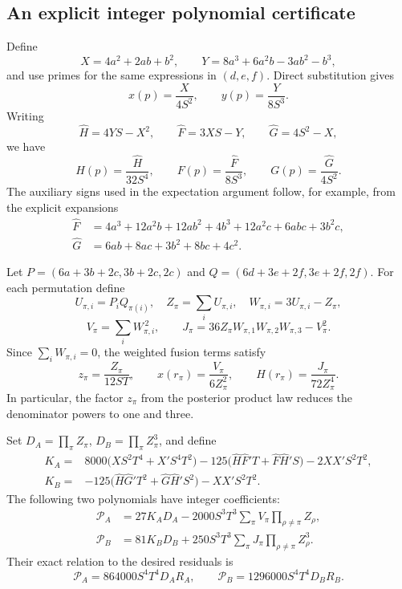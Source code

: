 \subsection{An explicit integer polynomial certificate}

Define
\[
 X=4a^2+2ab+b^2,\qquad
 Y=8a^3+6a^2b-3ab^2-b^3,
\]
and use primes for the same expressions in \((d,e,f)\).  Direct
substitution gives
\[
 x(p)=\frac{X}{4S^2},\qquad y(p)=\frac{Y}{8S^3}.
\]
Writing
\[
 \widehat H=4YS-X^2,\qquad
 \widehat F=3XS-Y,\qquad
 \widehat G=4S^2-X,
\]
we have
\[
 H(p)=\frac{\widehat H}{32S^4},\qquad
 F(p)=\frac{\widehat F}{8S^3},\qquad
 G(p)=\frac{\widehat G}{4S^2}.
\]
The auxiliary signs used in the expectation argument follow, for example,
from the explicit expansions
\begin{align*}
 \widehat F
 &=4a^3+12a^2b+12ab^2+4b^3+12a^2c+6abc+3b^2c,\\
 \widehat G
 &=6ab+8ac+3b^2+8bc+4c^2.
\end{align*}

Let \(P=(6a+3b+2c,3b+2c,2c)\) and
\(Q=(6d+3e+2f,3e+2f,2f)\).  For each permutation define
\[
 U_{\pi,i}=P_iQ_{\pi(i)},\quad
 Z_\pi=\sum_iU_{\pi,i},\quad
 W_{\pi,i}=3U_{\pi,i}-Z_\pi,
\]
\[
 V_\pi=\sum_iW_{\pi,i}^{\,2},\qquad
 J_\pi=36Z_\pi W_{\pi,1}W_{\pi,2}W_{\pi,3}-V_\pi^2.
\]
Since \(\sum_iW_{\pi,i}=0\), the weighted fusion terms satisfy
\[
 z_\pi=\frac{Z_\pi}{12ST},\qquad
 x(r_\pi)=\frac{V_\pi}{6Z_\pi^2},\qquad
 H(r_\pi)=\frac{J_\pi}{72Z_\pi^4}.
\]
In particular, the factor \(z_\pi\) from the posterior product law reduces
the denominator powers to one and three.

Set \(D_A=\prod_\pi Z_\pi\), \(D_B=\prod_\pi Z_\pi^3\), and define
\begin{align*}
 K_A={}&8000\bigl(XS^2T^4+X'S^4T^2\bigr)
       -125\bigl(\widehat H\widehat F'T+\widehat F\widehat H'S\bigr)
       -2XX'S^2T^2,\\
 K_B={}&-125\bigl(\widehat H\widehat G'T^2+
                         \widehat G\widehat H'S^2\bigr)-XX'S^2T^2.
\end{align*}
The following two polynomials have integer coefficients:
\begin{align}
 \mathcal P_A
 &=27K_AD_A-2000S^3T^3
       \sum_\pi V_\pi\prod_{\rho\ne\pi}Z_\rho, \label{eq:app-PA}\\
 \mathcal P_B
 &=81K_BD_B+250S^3T^3
       \sum_\pi J_\pi\prod_{\rho\ne\pi}Z_\rho^3. \label{eq:app-PB}
\end{align}
Their exact relation to the desired residuals is
\begin{equation}
 \mathcal P_A=864000S^4T^4D_A R_A,\qquad
 \mathcal P_B=1296000S^4T^4D_B R_B.                 \label{eq:app-clearing}
\end{equation}

